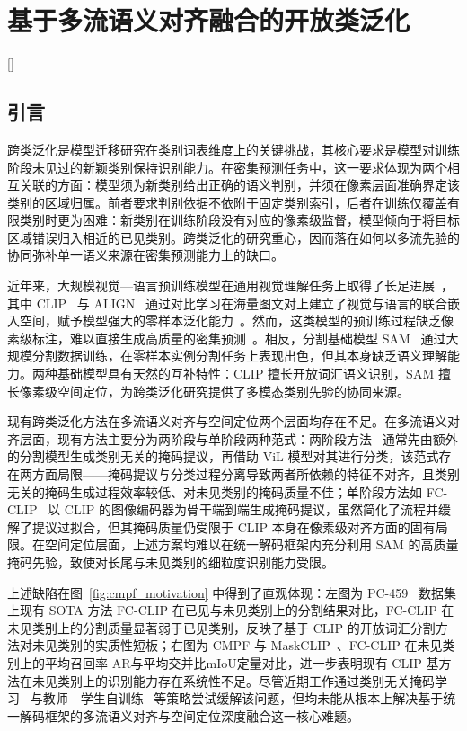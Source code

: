 
\chapter[基于多流语义对齐融合的开放类泛化]{基于多流语义对齐融合的开放类泛化}[]
\thispagestyle{plain}
\section{引言}

跨类泛化是模型迁移研究在类别词表维度上的关键挑战，其核心要求是模型对训练阶段未见过的新颖类别保持识别能力。在密集预测任务中，这一要求体现为两个相互关联的方面：模型须为新类别给出正确的语义判别，并须在像素层面准确界定该类别的区域归属。前者要求判别依据不依附于固定类别索引，后者在训练仅覆盖有限类别时更为困难：新类别在训练阶段没有对应的像素级监督，模型倾向于将目标区域错误归入相近的已见类别。跨类泛化的研究重心，因而落在如何以多流先验的协同弥补单一语义来源在密集预测能力上的缺口。

近年来，大规模视觉—语言预训练模型在通用视觉理解任务上取得了长足进展~\cite{yin2023vlp}，其中 CLIP~\cite{radford2021learning} 与 ALIGN~\cite{jia2021scaling} 通过对比学习在海量图文对上建立了视觉与语言的联合嵌入空间，赋予模型强大的零样本泛化能力~\cite{radford2021learning,zhou2022learning}。然而，这类模型的预训练过程缺乏像素级标注，难以直接生成高质量的密集预测~\cite{rao2022denseclip}。相反，分割基础模型 SAM~\cite{kirillov2023segment} 通过大规模分割数据训练，在零样本实例分割任务上表现出色，但其本身缺乏语义理解能力。两种基础模型具有天然的互补特性：CLIP 擅长开放词汇语义识别，SAM 擅长像素级空间定位，为跨类泛化研究提供了多模态类别先验的协同来源。

现有跨类泛化方法在多流语义对齐与空间定位两个层面均存在不足。在多流语义对齐层面，现有方法主要分为两阶段与单阶段两种范式：两阶段方法~\cite{liang2023open,ding2022decoupling,xu2022simple} 通常先由额外的分割模型生成类别无关的掩码提议，再借助 ViL 模型对其进行分类，该范式存在两方面局限——掩码提议与分类过程分离导致两者所依赖的特征不对齐，且类别无关的掩码生成过程效率较低、对未见类别的掩码质量不佳；单阶段方法如 FC-CLIP~\cite{yu2023convolutions} 以 CLIP 的图像编码器为骨干端到端生成掩码提议，虽然简化了流程并缓解了提议过拟合，但其掩码质量仍受限于 CLIP 本身在像素级对齐方面的固有局限。在空间定位层面，上述方案均难以在统一解码框架内充分利用 SAM 的高质量掩码先验，致使对长尾与未见类别的细粒度识别能力受限。

上述缺陷在图~\ref{fig:cmpf_motivation} 中得到了直观体现：左图为 PC-459~\cite{mottaghi2014role} 数据集上现有 SOTA 方法 FC-CLIP 在已见与未见类别上的分割结果对比，FC-CLIP 在未见类别上的分割质量显著弱于已见类别，反映了基于 CLIP 的开放词汇分割方法对未见类别的实质性短板；右图为 CMPF 与 MaskCLIP~\cite{ding2023open}、FC-CLIP 在未见类别上的平均召回率 AR与平均交并比mIoU定量对比，进一步表明现有 CLIP 基方法在未见类别上的识别能力存在系统性不足。尽管近期工作通过类别无关掩码学习~\cite{liang2023open,dou2022learning} 与教师—学生自训练~\cite{xu2023learning} 等策略尝试缓解该问题，但均未能从根本上解决基于统一解码框架的多流语义对齐与空间定位深度融合这一核心难题。

